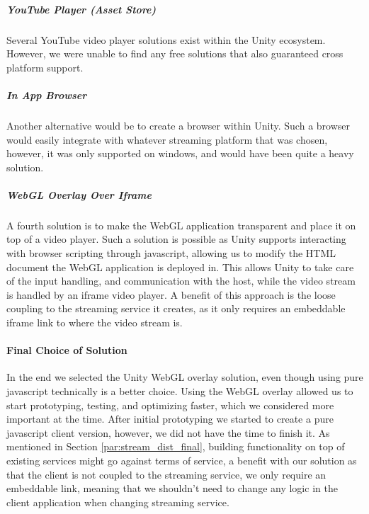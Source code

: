\subparagraph{YouTube Player (Asset Store)}
Several YouTube video player solutions exist within the Unity ecosystem. However, we were unable to find any free solutions that also guaranteed cross platform support. 

\subparagraph{In App Browser}
Another alternative would be to create a browser within Unity\cite{unity_simple_browser}. Such a browser would easily integrate with whatever streaming platform that was chosen, however, it was only supported on windows, and would have been quite a heavy solution.

\subparagraph{WebGL Overlay Over Iframe}
A fourth solution is to make the WebGL application transparent and place it on top of a video player. Such a solution is possible as Unity supports interacting with browser scripting through javascript\cite{unity_webgl_javascript_interaction}, allowing us to modify the HTML document the WebGL application is deployed in. 
This allows Unity to take care of the input handling, and communication with the host, while the video stream is handled by an iframe video player. A benefit of this approach is the loose coupling to the streaming service it creates, as it only requires an embeddable iframe link to where the video stream is.

    

\paragraph{Final Choice of Solution}
\label{par:client_final}
In the end we selected the Unity WebGL overlay solution, even though using pure javascript technically is a better choice. Using the WebGL overlay allowed us to start prototyping, testing, and optimizing faster, which we considered more important at the time. After initial prototyping we started to create a pure javascript client version, however, we did not have the time to finish it. 
As mentioned in Section \ref{par:stream_dist_final}, building functionality on top of existing services might go against terms of service, a benefit with our solution as that the client is not coupled to the streaming service, we only require an embeddable link, meaning that we shouldn't need to change any logic in the client application when changing streaming service.
